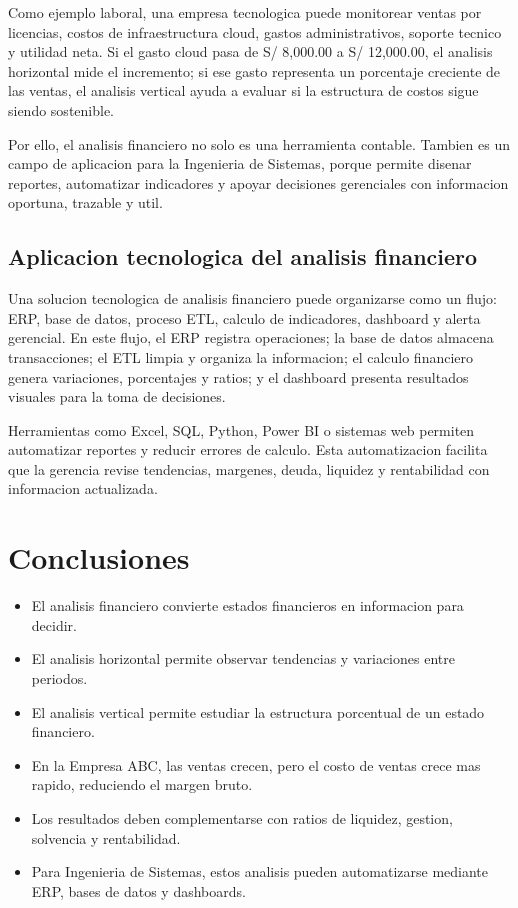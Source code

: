 Como ejemplo laboral, una empresa tecnologica puede monitorear ventas por licencias, costos de infraestructura cloud, gastos administrativos, soporte tecnico y utilidad neta. Si el gasto cloud pasa de S/ 8,000.00 a S/ 12,000.00, el analisis horizontal mide el incremento; si ese gasto representa un porcentaje creciente de las ventas, el analisis vertical ayuda a evaluar si la estructura de costos sigue siendo sostenible.

Por ello, el analisis financiero no solo es una herramienta contable. Tambien es un campo de aplicacion para la Ingenieria de Sistemas, porque permite disenar reportes, automatizar indicadores y apoyar decisiones gerenciales con informacion oportuna, trazable y util.

\subsection{Aplicacion tecnologica del analisis financiero}

Una solucion tecnologica de analisis financiero puede organizarse como un flujo: ERP, base de datos, proceso ETL, calculo de indicadores, dashboard y alerta gerencial. En este flujo, el ERP registra operaciones; la base de datos almacena transacciones; el ETL limpia y organiza la informacion; el calculo financiero genera variaciones, porcentajes y ratios; y el dashboard presenta resultados visuales para la toma de decisiones.

Herramientas como Excel, SQL, Python, Power BI o sistemas web permiten automatizar reportes y reducir errores de calculo. Esta automatizacion facilita que la gerencia revise tendencias, margenes, deuda, liquidez y rentabilidad con informacion actualizada.

\section{Conclusiones}

\begin{itemize}
  \item El analisis financiero convierte estados financieros en informacion para decidir.
  \item El analisis horizontal permite observar tendencias y variaciones entre periodos.
  \item El analisis vertical permite estudiar la estructura porcentual de un estado financiero.
  \item En la Empresa ABC, las ventas crecen, pero el costo de ventas crece mas rapido, reduciendo el margen bruto.
  \item Los resultados deben complementarse con ratios de liquidez, gestion, solvencia y rentabilidad.
  \item Para Ingenieria de Sistemas, estos analisis pueden automatizarse mediante ERP, bases de datos y dashboards.
\end{itemize}
